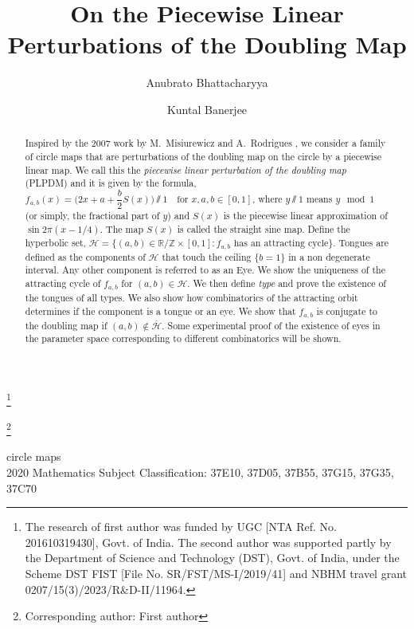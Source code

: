 \documentclass[12pt]{amsart}
\title{On the Piecewise Linear Perturbations of the Doubling Map}
\numberwithin{equation}{section}
\theoremstyle{remark}
\begin{document}
\author{Anubrato Bhattacharyya}
\address{Department of Mathematics, Presidency University, 86/1, College Street, Kolkata -
700073, West Bengal, India.}

\thanks{The research of first author was funded by UGC [NTA Ref. No. 201610319430], Govt. of India. The second author was supported  partly by the Department of Science and Technology (DST), Govt. of India, under the Scheme DST FIST [File No. SR/FST/MS-I/2019/41] and NBHM travel grant 0207/15(3)/2023/R\&D-II/11964.}


\author{Kuntal Banerjee}
\address{Department of Mathematics, Presidency University, 86/1, College Street, Kolkata -
700073, West Bengal, India.}


\thanks{Corresponding author: First author}

\keywords
{circle maps\\2020 Mathematics Subject Classification: 37E10, 37D05, 37B55, 37G15, 37G35, 37C70}

\begin{abstract}
Inspired by the 2007 work by  M.~Misiurewicz and A.~Rodrigues \cite{MR}, we consider a family of circle maps that are perturbations of the doubling map on the circle by a piecewise linear map.  We call this the  \textit{piecewise linear perturbation of the doubling map} (PLPDM) and it is given by the formula,
        $f_{a,b}(x)= \displaystyle \bigl(2x+a+\dfrac{b}{2} S(x) \bigr) \sslash 1 \quad {\text {for }} x, a, b \in [0,1] $, where  $y \sslash 1$ means $y \mod 1$ (or simply, the fractional part of $y$) and $S(x)$ is the piecewise linear approximation of $\sin 2\pi(x-1/4)$. The map $S(x)$ is called the straight sine map. Define the hyperbolic set, $\mathcal{H}= \{ (a,b) \in \mathbb{R}/\mathbb{Z} \times [0,1] : f_{a,b} \text{ has an attracting cycle} \}$. Tongues are defined as the components of $\mathcal{H}$
 that touch the ceiling $\{b=1\}$ in a non degenerate interval. Any other component is referred to as an Eye. We show the uniqueness of the attracting cycle of $f_{a,b}$ for  $(a,b) \in \mathcal{H}$. We then define \textit{type} and prove the existence of the tongues of all types. We also show how combinatorics of the attracting orbit determines if the component is a tongue or an eye. We show that $f_{a,b}$ is conjugate to the doubling map if $(a,b) \notin \overline{\mathcal{H}}$. Some experimental proof of the existence of eyes in the parameter space corresponding to different combinatorics will be shown.
\end{abstract}
\end{document}
